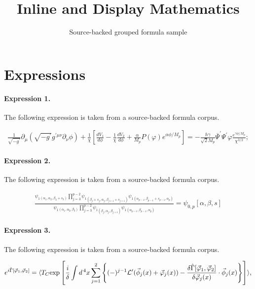 \documentclass[11pt]{article}
\title{Inline and Display Mathematics}
\author{Source-backed grouped formula sample}
\date{}
\begin{document}
\maketitle
\section{Expressions}
\paragraph{Expression 1.} The following expression is taken from a source-backed formula corpus.

\begin{align*}\frac{1}{\sqrt{-g^{\prime}}}\partial_{\mu}(\sqrt{-g^{\prime}}g^{\prime\mu\nu}\partial_{\nu}\phi)+ \frac{1}{\chi}\left[\frac{dV_{1}}{d\phi}-\frac{1}{\chi}\frac{dV_{2}}{d\phi}+\frac{\alpha}{M_{p}}P(\varphi)e^{\alpha\phi /M_{p}}\right]=-\frac{h\gamma}{\sqrt{2}M_{p}}\overline{\Psi}^{\prime}\Psi^{\prime} \varphi \frac{e^{\gamma\phi/M_{p}}}{\chi^{3/2}}; \end{align*}

\paragraph{Expression 2.} The following expression is taken from a source-backed formula corpus.

\begin{align*}\frac{\psi_1{}_{(\alpha_1,\alpha_2,\beta_3+s_3)}\prod_{j=3}^{p-2}\psi_1{}_{(\beta_j+s_{j},\alpha_j,\beta_{j+1}+s_{j+1})}\psi_1{}_{(\alpha_{p-1},\beta_{p-1}+s_{p-1},\alpha_p)}}{\psi_1{}_{(\alpha_1,\alpha_2,\beta_3)}\prod_{j=3}^{p-2}\psi_1{}_{(\beta_j,\alpha_j,\beta_{j+1})}\psi_1{}_{(\alpha_{p-1},\beta_{p-1},\alpha_p)}}= \psi_{0,p}[\alpha,\beta,s]\end{align*}

\paragraph{Expression 3.} The following expression is taken from a source-backed formula corpus.

\begin{align*}e^{i \hat{\Gamma} [\vec{\varphi}_1, \vec{\varphi}_2]} = \langle T_C \text{exp} \left[ \frac{i}{\delta} \int d^{\, 4} x \sum_{j = 1}^2 \left\{ (-)^{j - 1} {\cal L}' (\vec{\phi}_j (x) + \vec{\varphi}_j (x)) - \frac{\delta \hat{\Gamma} [\vec{\varphi}_1, \vec{\varphi}_2]}{\delta \vec{\varphi}_j (x)} \cdot \vec{\phi}_j (x) \right\} \right] \rangle , \end{align*}
\end{document}
